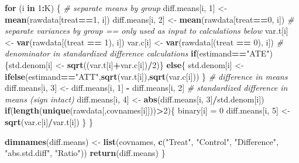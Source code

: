 \documentclass[
  12pt,
]{article}
\newenvironment{Shaded}{\begin{snugshade}}{\end{snugshade}}
\newcommand{\CommentTok}[1]{\textcolor[rgb]{0.56,0.35,0.01}{\textit{#1}}}
\newcommand{\ControlFlowTok}[1]{\textcolor[rgb]{0.13,0.29,0.53}{\textbf{#1}}}
\newcommand{\DecValTok}[1]{\textcolor[rgb]{0.00,0.00,0.81}{#1}}
\newcommand{\FunctionTok}[1]{\textcolor[rgb]{0.13,0.29,0.53}{\textbf{#1}}}
\newcommand{\NormalTok}[1]{#1}
\newcommand{\OtherTok}[1]{\textcolor[rgb]{0.56,0.35,0.01}{#1}}
\newcommand{\SpecialCharTok}[1]{\textcolor[rgb]{0.81,0.36,0.00}{\textbf{#1}}}
\newcommand{\StringTok}[1]{\textcolor[rgb]{0.31,0.60,0.02}{#1}}
\begin{document}
\begin{Shaded}
\begin{Highlighting}[]
  \ControlFlowTok{for}\NormalTok{ (i }\ControlFlowTok{in} \DecValTok{1}\SpecialCharTok{:}\NormalTok{K) \{}
    \CommentTok{\# separate means by group}
\NormalTok{    diff.means[i, }\DecValTok{1}\NormalTok{] }\OtherTok{\textless{}{-}} \FunctionTok{mean}\NormalTok{(rawdata[treat}\SpecialCharTok{==}\DecValTok{1}\NormalTok{, i])}
\NormalTok{    diff.means[i, }\DecValTok{2}\NormalTok{] }\OtherTok{\textless{}{-}} \FunctionTok{mean}\NormalTok{(rawdata[treat}\SpecialCharTok{==}\DecValTok{0}\NormalTok{, i])}
    \CommentTok{\# separate variances by group == only used as input to calculations below}
\NormalTok{    var.t[i] }\OtherTok{\textless{}{-}} \FunctionTok{var}\NormalTok{(rawdata[(treat }\SpecialCharTok{==} \DecValTok{1}\NormalTok{), i])}
\NormalTok{    var.c[i] }\OtherTok{\textless{}{-}} \FunctionTok{var}\NormalTok{(rawdata[(treat }\SpecialCharTok{==} \DecValTok{0}\NormalTok{), i])}
    \CommentTok{\# denominator in standardized difference calculations}
    \ControlFlowTok{if}\NormalTok{(estimand}\SpecialCharTok{==}\StringTok{"ATE"}\NormalTok{)\{std.denom[i] }\OtherTok{\textless{}{-}} \FunctionTok{sqrt}\NormalTok{((var.t[i]}\SpecialCharTok{+}\NormalTok{var.c[i])}\SpecialCharTok{/}\DecValTok{2}\NormalTok{)\}}
    \ControlFlowTok{else}\NormalTok{\{}
\NormalTok{      std.denom[i] }\OtherTok{\textless{}{-}} \FunctionTok{ifelse}\NormalTok{(estimand}\SpecialCharTok{==}\StringTok{"ATT"}\NormalTok{,}\FunctionTok{sqrt}\NormalTok{(var.t[i]),}\FunctionTok{sqrt}\NormalTok{(var.c[i]))}
\NormalTok{    \}}
    \CommentTok{\# difference in means}
\NormalTok{    diff.means[i, }\DecValTok{3}\NormalTok{] }\OtherTok{\textless{}{-}}\NormalTok{ diff.means[i, }\DecValTok{1}\NormalTok{] }\SpecialCharTok{{-}}\NormalTok{ diff.means[i, }\DecValTok{2}\NormalTok{]}
    \CommentTok{\# standardized difference in means (sign intact)}
\NormalTok{    diff.means[i, }\DecValTok{4}\NormalTok{] }\OtherTok{\textless{}{-}} \FunctionTok{abs}\NormalTok{(diff.means[i, }\DecValTok{3}\NormalTok{]}\SpecialCharTok{/}\NormalTok{std.denom[i])}
    \ControlFlowTok{if}\NormalTok{(}\FunctionTok{length}\NormalTok{(}\FunctionTok{unique}\NormalTok{(rawdata[,covnames[i]]))}\SpecialCharTok{\textgreater{}}\DecValTok{2}\NormalTok{)\{}
\NormalTok{      binary[i] }\OtherTok{=} \DecValTok{0}
\NormalTok{      diff.means[i, }\DecValTok{5}\NormalTok{] }\OtherTok{\textless{}{-}} \FunctionTok{sqrt}\NormalTok{(var.c[i]}\SpecialCharTok{/}\NormalTok{var.t[i])}
\NormalTok{    \}}
\NormalTok{  \}}
  
  \FunctionTok{dimnames}\NormalTok{(diff.means) }\OtherTok{\textless{}{-}} \FunctionTok{list}\NormalTok{(covnames, }\FunctionTok{c}\NormalTok{(}\StringTok{"Treat"}\NormalTok{, }\StringTok{"Control"}\NormalTok{, }\StringTok{"Difference"}\NormalTok{,}
                                           \StringTok{"abs.std.diff"}\NormalTok{, }\StringTok{"Ratio"}\NormalTok{))}
  \FunctionTok{return}\NormalTok{(diff.means)}
\NormalTok{\}}


\end{Highlighting}
\end{Shaded}
\end{document}
